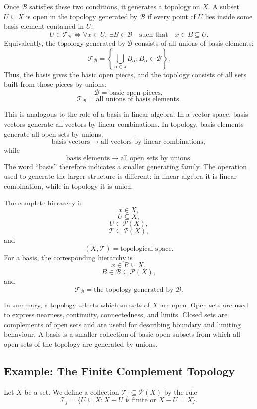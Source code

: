 \documentclass{article}
\begin{document}
	Once \(\mathcal B\) satisfies these two conditions, it generates a topology on \(X\). A subset \(U\subseteq X\) is open in the topology generated by \(\mathcal B\) if every point of \(U\) lies inside some basis element contained in \(U\):
	\[
	U\in\mathcal T_{\mathcal B}
	\iff
	\forall x\in U,\ \exists B\in\mathcal B
	\quad\text{such that}\quad
	x\in B\subseteq U.
	\]
	Equivalently, the topology generated by \(\mathcal B\) consists of all unions of basis elements:
	\[
	\mathcal T_{\mathcal B}
	=
	\left\{
	\bigcup_{\alpha\in J}B_\alpha:
	B_\alpha\in\mathcal B
	\right\}.
	\]
	Thus, the basis gives the basic open pieces, and the topology consists of all sets built from those pieces by unions:
	\[
	\mathcal B=\text{basic open pieces},
	\]
	\[
	\mathcal T_{\mathcal B}=\text{all unions of basis elements}.
	\]
	
	This is analogous to the role of a basis in linear algebra. In a vector space, basis vectors generate all vectors by linear combinations. In topology, basis elements generate all open sets by unions:
	\[
	\text{basis vectors}
	\longrightarrow
	\text{all vectors by linear combinations},
	\]
	while
	\[
	\text{basis elements}
	\longrightarrow
	\text{all open sets by unions}.
	\]
	The word ``basis'' therefore indicates a smaller generating family. The operation used to generate the larger structure is different: in linear algebra it is linear combination, while in topology it is union.
	
	The complete hierarchy is
	\[
	x\in X,
	\]
	\[
	U\subseteq X,
	\]
	\[
	U\in\mathcal P(X),
	\]
	\[
	\mathcal T\subseteq\mathcal P(X),
	\]
	and
	\[
	(X,\mathcal T)=\text{topological space}.
	\]
	For a basis, the corresponding hierarchy is
	\[
	x\in B\subseteq X,
	\]
	\[
	B\in\mathcal B\subseteq\mathcal P(X),
	\]
	and
	\[
	\mathcal T_{\mathcal B}
	=
	\text{the topology generated by }\mathcal B.
	\]
	
	In summary, a topology selects which subsets of \(X\) are open. Open sets are used to express nearness, continuity, connectedness, and limits. Closed sets are complements of open sets and are useful for describing boundary and limiting behaviour. A basis is a smaller collection of basic open subsets from which all open sets of the topology are generated by unions.
	
	\subsection{Example: The Finite Complement Topology}
	
	Let \(X\) be a set. We define a collection \(\mathcal T_f\subseteq\mathcal P(X)\) by the rule
	\[
	\mathcal T_f
	=
	\{U\subseteq X:X-U\text{ is finite or }X-U=X\}.
	\]
	
\end{document}
